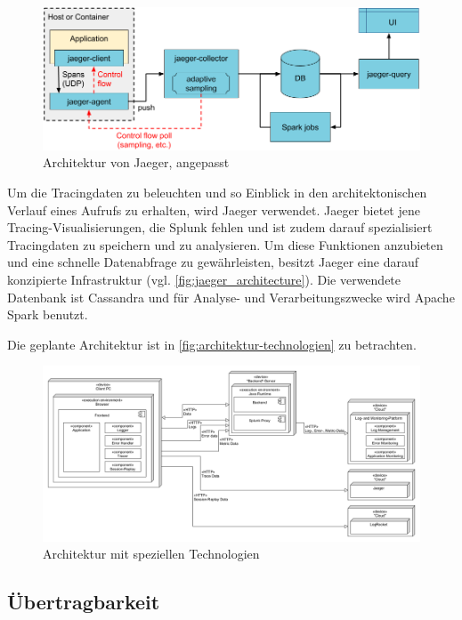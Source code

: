 \begin{figure}
\centering
\includegraphics[width=\linewidth]{img/04_erstellung-poc/jaeger_architecture-v1_edited.png}
\caption{Architektur von Jaeger, angepasst \cite{JaegerArchitecture}}
\label{fig:jaeger_architecture}
\end{figure}
	
	Um die Tracingdaten zu beleuchten und so Einblick in den architektonischen Verlauf eines Aufrufs zu erhalten, wird Jaeger verwendet. Jaeger bietet jene Tracing-Visualisierungen, die Splunk fehlen und ist zudem darauf spezialisiert Tracingdaten zu speichern und zu analysieren. Um diese Funktionen anzubieten und eine schnelle Datenabfrage zu gewährleisten, besitzt Jaeger eine darauf konzipierte Infrastruktur (vgl. \autoref{fig:jaeger_architecture}). Die verwendete Datenbank ist Cassandra und für Analyse- und Verarbeitungszwecke wird Apache Spark benutzt.
	
	Die geplante Architektur ist in \autoref{fig:architektur-technologien} zu betrachten.
	
\begin{figure}[H]
	\centering
	\includegraphics[width=0.75\linewidth]{img/04_erstellung-poc/konzept-technologien.png}
	\caption{Architektur mit speziellen Technologien}
	\label{fig:architektur-technologien}
\end{figure}

	\subsection{Übertragbarkeit}
	
